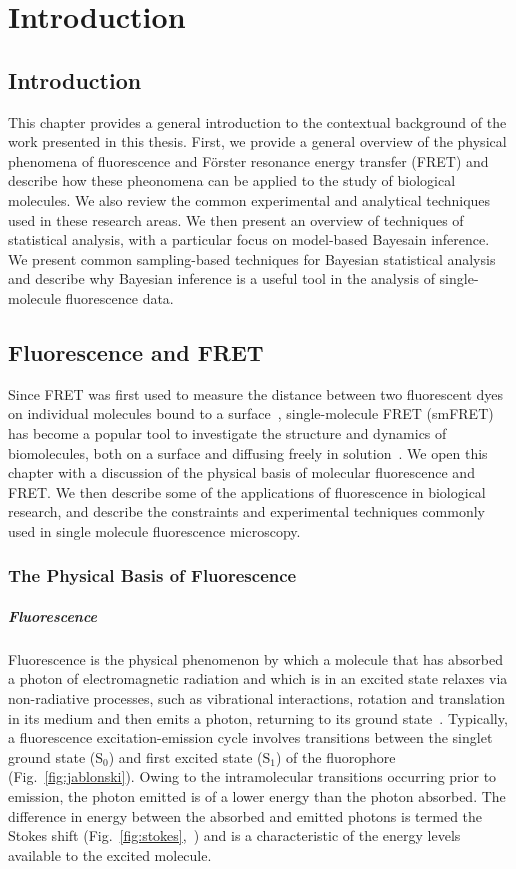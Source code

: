 \chapter{Introduction}
\label{chap:intro}
\section{Introduction}
This chapter provides a general introduction to the contextual background of the work presented in this thesis. First, we provide a general overview of the physical phenomena of fluorescence and F\"{o}rster resonance energy transfer (FRET) and describe how these pheonomena can be applied to the study of biological molecules. We also review the common experimental and analytical techniques used in these research areas. We then present an overview of techniques of statistical analysis, with a particular focus on model-based Bayesain inference. We present common sampling-based techniques for Bayesian statistical analysis and describe why Bayesian inference is a useful tool in the analysis of single-molecule fluorescence data.

\section{Fluorescence and FRET}
Since FRET was first used to measure the distance between two fluorescent dyes on individual molecules bound to a surface~\cite{ha96}, single-molecule FRET (smFRET) has become a popular tool to investigate the structure and dynamics of biomolecules, both on a surface and diffusing freely in solution~\cite{haran03, schuler02, weiss00}. We open this chapter with a discussion of the physical basis of molecular fluorescence and FRET. We then describe some of the applications of fluorescence in biological research, and describe the constraints and experimental techniques commonly used in single molecule fluorescence microscopy.

\subsection{The Physical Basis of Fluorescence}
\paragraph{Fluorescence}
Fluorescence is the physical phenomenon by which a molecule that has absorbed a photon of electromagnetic radiation and which is in an excited state relaxes via non-radiative processes, such as vibrational interactions, rotation and translation in its medium and then  emits a photon, returning to its ground state~\cite{valeur2001}. Typically, a fluorescence excitation-emission cycle involves transitions between the singlet ground state ($\text{S}_0$) and first excited state ($\text{S}_1$) of the fluorophore (Fig.~\ref{fig:jablonski}). Owing to the intramolecular transitions occurring prior to emission, the photon emitted is of a lower energy than the photon absorbed. The difference in energy between the absorbed and emitted photons is termed the Stokes shift (Fig.~\ref{fig:stokes},~\cite{Albani2011}) and is a characteristic of the energy levels available to the excited molecule. 

